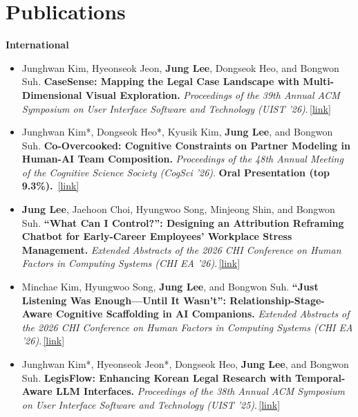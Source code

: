 \documentclass[letterpaper,10pt]{article}
\newcommand{\pub}[1]{\,\href{#1}{\small [link]}}
\let\oldsection\section
\renewcommand{\section}[1]{\needspace{8\baselineskip}\oldsection{#1}}
\newenvironment{plain}
  {\begin{itemize}[leftmargin=1.2em, itemsep=\PLAINSEP, parsep=0pt, topsep=\TOPSEP]}
  {\end{itemize}}
\newcommand{\me}{\textbf{Jung Lee}}   %
\begin{document}
\section{Publications}
\textbf{International}
\begin{plain}

  \item Junghwan Kim, Hyeonseok Jeon, \me, Dongseok Heo, and Bongwon Suh.
        \textbf{CaseSense: Mapping the Legal Case Landscape with Multi-Dimensional Visual
        Exploration.} \textit{Proceedings of the 39th Annual ACM Symposium on User Interface
        Software and Technology (UIST '26)}.\pub{https://uist.from.so/authors/9669/PpjiLop9__pd}

  \item Junghwan Kim*, Dongseok Heo*, Kyusik Kim, \me, and Bongwon Suh.
        \textbf{Co-Overcooked: Cognitive Constraints on Partner Modeling in Human-AI Team
        Composition.} \textit{Proceedings of the 48th Annual Meeting of the Cognitive Science
        Society (CogSci '26)}. \textbf{Oral Presentation (top 9.3\%).} \pub{https://escholarship.org/uc/item/39n1g8g6}

  \item \me, Jaehoon Choi, Hyungwoo Song, Minjeong Shin, and Bongwon Suh.
        \textbf{``What Can I Control?'': Designing an Attribution Reframing Chatbot for
        Early-Career Employees' Workplace Stress Management.} \textit{Extended Abstracts of the
        2026 CHI Conference on Human Factors in Computing Systems (CHI EA '26)}.\pub{https://dl.acm.org/doi/10.1145/3772363.3798873}

  \item Minchae Kim, Hyungwoo Song, \me, and Bongwon Suh.
        \textbf{``Just Listening Was Enough---Until It Wasn't'': Relationship-Stage-Aware
        Cognitive Scaffolding in AI Companions.} \textit{Extended Abstracts of the 2026 CHI
        Conference on Human Factors in Computing Systems (CHI EA '26)}.\pub{https://dl.acm.org/doi/10.1145/3772363.3798512}

  \item Junghwan Kim*, Hyeonseok Jeon*, Dongseok Heo, \me, and Bongwon Suh.
        \textbf{LegisFlow: Enhancing Korean Legal Research with Temporal-Aware LLM Interfaces.}
        \textit{Proceedings of the 38th Annual ACM Symposium on User Interface Software and
        Technology (UIST '25)}.\pub{https://dl.acm.org/doi/10.1145/3746059.3747752}
\end{plain}
\vspace{0.3em}
\end{document}
